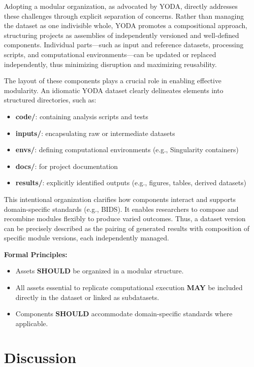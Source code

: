 \documentclass{article}
\begin{document}
Adopting a modular organization, as advocated by YODA, directly addresses these challenges through explicit separation of concerns.
Rather than managing the dataset as one indivisible whole, YODA promotes a compositional approach, structuring projects as assemblies of independently versioned and well-defined components.
Individual parts—such as input and reference datasets, processing scripts, and computational environments—can be updated or replaced independently, thus minimizing disruption and maximizing reusability.

The layout of these components plays a crucial role in enabling effective modularity.
An idiomatic YODA dataset clearly delineates elements into structured directories, such as:

\begin{itemize}
  \item \textbf{code/}: containing analysis scripts and tests
  \item \textbf{inputs/}: encapsulating raw or intermediate datasets
  \item \textbf{envs/}: defining computational environments (e.g., Singularity containers)
  \item \textbf{docs/}: for project documentation
  \item \textbf{results/}: explicitly identified outputs (e.g., figures, tables, derived datasets)
\end{itemize}

This intentional organization clarifies how components interact and supports domain-specific standards (e.g., BIDS).
It enables researchers to compose and recombine modules flexibly to produce varied outcomes.
Thus, a dataset version can be precisely described as the pairing of generated results with composition of specific module versions, each independently managed.

\textbf{Formal Principles:}

\begin{itemize}
  \item Assets \textbf{SHOULD} be organized in a modular structure.
  \item All assets essential to replicate computational execution \textbf{MAY} be included directly in the dataset or linked as subdatasets.
  \item Components \textbf{SHOULD} accommodate domain-specific standards where applicable.
\end{itemize}

\section{Discussion}
\end{document}
